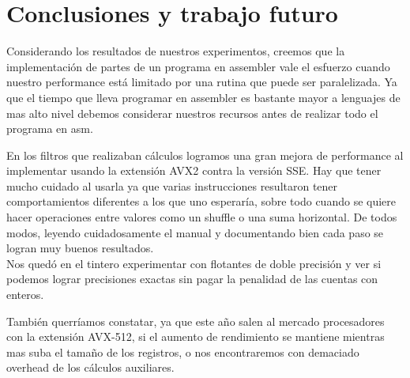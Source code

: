 \section{Conclusiones y trabajo futuro}

Considerando los resultados de nuestros experimentos, creemos que la implementación de partes de un programa en assembler vale el esfuerzo cuando nuestro performance está limitado por una rutina que puede ser paralelizada. Ya que el tiempo que lleva programar en assembler es bastante mayor a lenguajes de mas alto nivel debemos considerar nuestros recursos antes de realizar todo el programa en asm.

En los filtros que realizaban cálculos logramos una gran mejora de performance al implementar usando la extensión AVX2 contra la versión SSE. Hay que tener mucho cuidado al usarla ya que varias instrucciones resultaron tener comportamientos diferentes a los que uno esperaría, sobre todo cuando se quiere hacer operaciones entre valores como un shuffle o una suma horizontal. De todos modos, leyendo cuidadosamente el manual y documentando bien cada paso se logran muy buenos resultados.
\\

Nos quedó en el tintero experimentar con flotantes de doble precisión y ver si podemos lograr precisiones exactas sin pagar la penalidad de las cuentas con enteros.

También querríamos constatar, ya que este año salen al mercado procesadores con la extensión AVX-512, si el aumento de rendimiento se mantiene mientras mas suba el tamaño de los registros, o nos encontraremos con demaciado overhead de los cálculos auxiliares.

